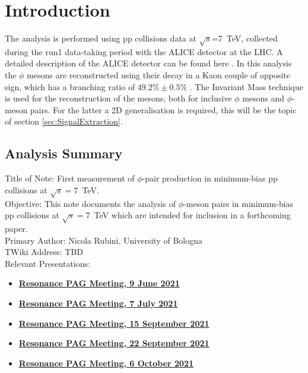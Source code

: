 \section{Introduction}
\label{sec:Introduction}
The analysis is performed using pp collisions data at $\sqrt{s}$=\SI{7}{\tera\electronvolt}, collected during the run1 data-taking period with the ALICE detector at the LHC. A detailed description of the ALICE detector can be found here \cite{Collaboration_2008}. In this analysis the $\phi$ mesons are reconstructed using their decay in a Kaon couple of opposite sign, which has a branching ratio of $49.2\%\pm 0.5\%$ \cite{PDG}. The Invariant Mass technique is used for the reconstruction of the mesons, both for inclusive $\phi$ mesons and $\phi$-meson pairs. For the latter a 2D generalisation is required, this will be the topic of section \ref{sec:SignalExtraction}.\\

\subsection{Analysis Summary}
Title of Note: First measurement of $\phi$-pair production in minimum-bias pp collisions at $\sqrt{s}=$\SI{7}{\tera\electronvolt}.\\
Objective: This note documents the analysis of $\phi$-meson pairs in minimum-bias pp collisions at $\sqrt{s}=$\SI{7}{\tera\electronvolt} which are intended for inclusion in a forthcoming paper.\\
Primary Author: Nicola Rubini, University of Bologna\\
TWiki Address: TBD\\
Relevant Presentations:
\begin{itemize}
\item \href{https://indico.cern.ch/event/1046617/}{\bf{Resonance PAG Meeting, 9 June 2021}}
\item \href{https://indico.cern.ch/event/1052315/}{\bf{Resonance PAG Meeting, 7 July 2021}}
\item \href{https://indico.cern.ch/event/1074274/}{\bf{Resonance PAG Meeting, 15 September 2021}}
\item \href{https://indico.cern.ch/event/1079015/}{\bf{Resonance PAG Meeting, 22 September 2021}}
\item \href{https://indico.cern.ch/event/1081307/}{\bf{Resonance PAG Meeting, 6 October 2021}}
\end{itemize}

